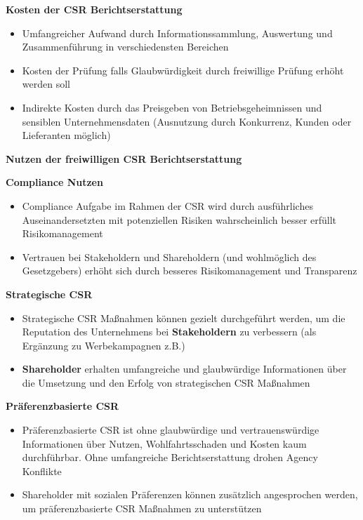 \documentclass[
]{article}
\providecommand{\tightlist}{%
  \setlength{\itemsep}{0pt}\setlength{\parskip}{0pt}}
\begin{document}
\textbf{Kosten der CSR Berichtserstattung}

\begin{itemize}
\tightlist
\item
  Umfangreicher Aufwand durch Informationssammlung, Auswertung und
  Zusammenführung in verschiedensten Bereichen
\item
  Kosten der Prüfung falls Glaubwürdigkeit durch freiwillige Prüfung
  erhöht werden soll
\item
  Indirekte Kosten durch das Preisgeben von Betriebsgeheimnissen und
  sensiblen Unternehmensdaten (Ausnutzung durch Konkurrenz, Kunden oder
  Lieferanten möglich)
\end{itemize}

\textbf{Nutzen der freiwilligen CSR Berichtserstattung}

\textbf{Compliance Nutzen}

\begin{itemize}
\tightlist
\item
  Compliance Aufgabe im Rahmen der CSR wird durch ausführliches
  Auseinandersetzten mit potenziellen Risiken wahrscheinlich besser
  erfüllt Risikomanagement
\item
  Vertrauen bei Stakeholdern und Shareholdern (und wohlmöglich des
  Gesetzgebers) erhöht sich durch besseres Risikomanagement und
  Transparenz
\end{itemize}

\textbf{Strategische CSR}

\begin{itemize}
\tightlist
\item
  Strategische CSR Maßnahmen können gezielt durchgeführt werden, um die
  Reputation des Unternehmens bei \textbf{Stakeholdern} zu verbessern
  (als Ergänzung zu Werbekampagnen z.B.)
\item
  \textbf{Shareholder} erhalten umfangreiche und glaubwürdige
  Informationen über die Umsetzung und den Erfolg von strategischen CSR
  Maßnahmen
\end{itemize}

\textbf{Präferenzbasierte CSR}

\begin{itemize}
\tightlist
\item
  Präferenzbasierte CSR ist ohne glaubwürdige und vertrauenswürdige
  Informationen über Nutzen, Wohlfahrtsschaden und Kosten kaum
  durchführbar. Ohne umfangreiche Berichtserstattung drohen Agency
  Konflikte
\item
  Shareholder mit sozialen Präferenzen können zusätzlich angesprochen
  werden, um präferenzbasierte CSR Maßnahmen zu unterstützen
\end{itemize}
\end{document}

